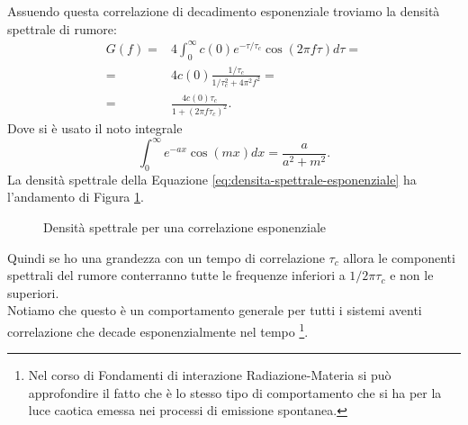 Assuendo questa correlazione di decadimento esponenziale troviamo la densità spettrale di rumore:
\[\begin{aligned}
	G(f ) 
	=&
	4 \int_{0}^{\infty} c( 0) e^{-\tau/\tau_c}\cos(2\pi f\tau)d\tau =\\
	=&
	4c(0)\frac{1/\tau_c}{1/\tau_c^2+4\pi^2f^2}=\\
	=&
	\frac{4c(0)\tau_c}{1+\left(2\pi f\tau_c\right)^2} 
	\label{eq:densita-spettrale-esponenziale}
.\end{aligned}\]
Dove si è usato il noto integrale \[
	\int_{0}^{\infty} e^{-ax} \cos(mx)dx 
	=
	\frac{a}{a^2+m^2}
.\] 
La densità spettrale della Equazione \ref{eq:densita-spettrale-esponenziale} ha l'andamento di Figura \ref{fig:densita-spettrale-per-una-correlazione-esponenziale}.
\begin{figure}[ht]
    \centering
    \caption{Densità spettrale per una correlazione esponenziale}
    \label{fig:densita-spettrale-per-una-correlazione-esponenziale}
\end{figure}
Quindi se ho una grandezza con un tempo di correlazione $\tau_c$ allora le componenti spettrali del rumore conterranno tutte le frequenze inferiori a $1/2\pi\tau_c$ e non le superiori.\\
Notiamo che questo è un comportamento generale per tutti i sistemi aventi correlazione che decade esponenzialmente nel tempo \footnote{Nel corso di Fondamenti di interazione Radiazione-Materia si può approfondire il fatto che è lo stesso tipo di comportamento che si ha per la luce caotica emessa nei processi di emissione spontanea.}.
